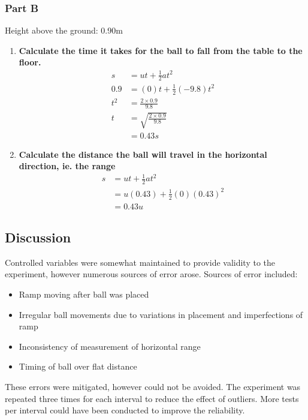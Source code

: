 		\subsubsection{Part B}
			Height above the ground: 0.90m
			\begin{enumerate}
				\item \textbf{Calculate the time it takes for the ball to fall from the table to the floor.}
					\begin{align*}
						s &= ut + \frac{1}{2}at^2 \\
						0.9 &= (0)t + \frac{1}{2}(-9.8)t^2 \\
						t^2 &= \frac{2 \times 0.9}{9.8} \\
						t &= \sqrt{\frac{2 \times 0.9}{9.8}} \\
						&= 0.43 s
					\end{align*} 
				\item \textbf{Calculate the distance the ball will travel in the horizontal direction, ie. the range}
					\begin{align*}
						s &= ut + \frac{1}{2}at^2 \\
						&= u(0.43) + \frac{1}{2}(0)(0.43)^2\\
						&= 0.43u
					\end{align*}
			\end{enumerate}

	\subsection{Discussion}
		Controlled variables were somewhat maintained to provide validity to the experiment, however numerous sources of error arose. Sources of error included:
		\begin{itemize}
			\item Ramp moving after ball was placed
			\item Irregular ball movements due to variations in placement and imperfections of ramp
			\item Inconsistency of measurement of horizontal range
			\item Timing of ball over flat distance
		\end{itemize}
		These errors were mitigated, however could not be avoided. The experiment was repeated three times for each interval to reduce the effect of outliers. More tests per interval could have been conducted to improve the reliability.
	
